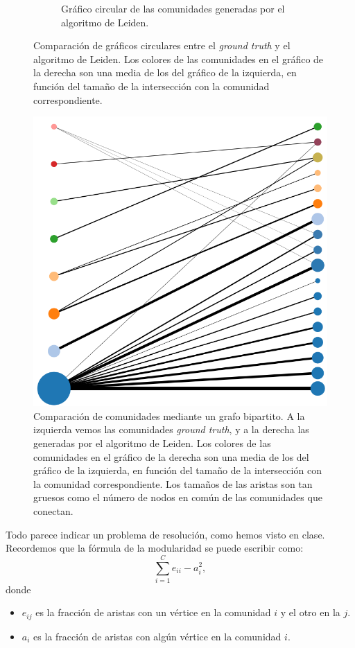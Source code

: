 \begin{figure}[!htb]
\begin{subfigure}{.4\textwidth}
    \caption{Gráfico circular de las comunidades generadas por el algoritmo de Leiden. }
    \label{fig:1-circular-comp-2}
  \end{subfigure}
  \caption{Comparación de gráficos circulares entre el \emph{ground truth} y el
    algoritmo de Leiden. Los colores de las comunidades en el gráfico de la
    derecha son una media de los del gráfico de la izquierda, en función del
    tamaño de la intersección con la comunidad correspondiente.}
  \label{fig:1-circular-comp}
\end{figure}

\begin{figure}[!htb]
  \centering
  \includegraphics[width=.9\linewidth]{img/1_bipartite_comp}
  \caption{Comparación de comunidades mediante un grafo bipartito. A la
    izquierda vemos las comunidades \emph{ground truth}, y a la derecha las
    generadas por el algoritmo de Leiden.  Los colores de las comunidades en el
    gráfico de la derecha son una media de los del gráfico de la izquierda, en
    función del tamaño de la intersección con la comunidad correspondiente. Los
    tamaños de las aristas son tan gruesos como el número de nodos en común de las
    comunidades que conectan.}
  \label{fig:1-bipartite}
\end{figure}



Todo parece indicar un problema de resolución, como hemos visto en clase.
Recordemos que la fórmula de la modularidad se puede escribir como:
$$
\sum_{i=1}^C e_{ii} - a_i^2,
$$
donde
\begin{itemize}
  \item $e_{ij}$ es la fracción de aristas con un vértice en la comunidad $i$ y
    el otro en la $j$.
  \item $a_i$ es la fracción de aristas con algún vértice en la comunidad $i$.
\end{itemize}

